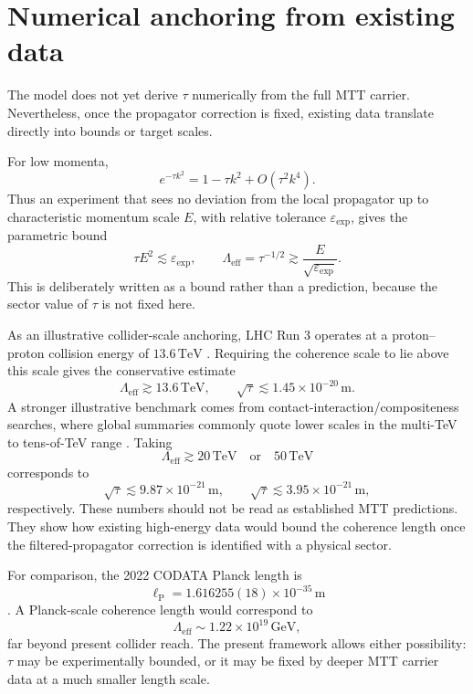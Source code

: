 \documentclass[11pt]{article}
\begin{document}
\section{Numerical anchoring from existing data}

The model does not yet derive \(\tau\) numerically from the full MTT carrier. Nevertheless, once the propagator correction is fixed, existing data translate directly into bounds or target scales.

For low momenta,
\[
        e^{-\tau k^2}=1-\tau k^2+O(\tau^2 k^4).
\]
Thus an experiment that sees no deviation from the local propagator up to characteristic momentum scale \(E\), with relative tolerance \(\varepsilon_{\mathrm{exp}}\), gives the parametric bound
\[
        \tau E^2 \lesssim \varepsilon_{\mathrm{exp}},
        \qquad
        \Lambda_{\mathrm{eff}}=\tau^{-1/2}
        \gtrsim \frac{E}{\sqrt{\varepsilon_{\mathrm{exp}}}}.
\]
This is deliberately written as a bound rather than a prediction, because the sector value of \(\tau\) is not fixed here.

As an illustrative collider-scale anchoring, LHC Run 3 operates at a proton--proton collision energy of \(13.6\,\mathrm{TeV}\) \cite{CERNRun3}. Requiring the coherence scale to lie above this scale gives the conservative estimate
\[
        \Lambda_{\mathrm{eff}}\gtrsim 13.6\,\mathrm{TeV},
        \qquad
        \sqrt{\tau}\lesssim 1.45\times 10^{-20}\,\mathrm{m}.
\]
A stronger illustrative benchmark comes from contact-interaction/compositeness searches, where global summaries commonly quote lower scales in the multi-TeV to tens-of-TeV range \cite{PDGCompositeness2025}. Taking
\[
        \Lambda_{\mathrm{eff}}\gtrsim 20\,\mathrm{TeV}
        \quad\text{or}\quad
        50\,\mathrm{TeV}
\]
corresponds to
\[
        \sqrt{\tau}\lesssim 9.87\times10^{-21}\,\mathrm{m},
        \qquad
        \sqrt{\tau}\lesssim 3.95\times10^{-21}\,\mathrm{m},
\]
respectively. These numbers should not be read as established MTT predictions. They show how existing high-energy data would bound the coherence length once the filtered-propagator correction is identified with a physical sector.

For comparison, the 2022 CODATA Planck length is
\[
        \ell_{\mathrm P}=1.616255(18)\times10^{-35}\,\mathrm{m}
\]
\cite{NISTPlanck}. A Planck-scale coherence length would correspond to
\[
        \Lambda_{\mathrm{eff}}\sim 1.22\times10^{19}\,\mathrm{GeV},
\]
far beyond present collider reach. The present framework allows either possibility: \(\tau\) may be experimentally bounded, or it may be fixed by deeper MTT carrier data at a much smaller length scale.
\end{document}
